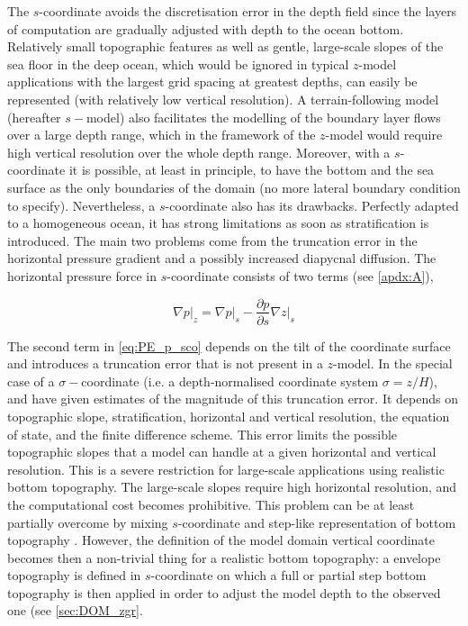 \documentclass[../main/NEMO_manual]{subfiles}
\begin{document}
The $s$-coordinate avoids the discretisation error in the depth field since the layers of
computation are gradually adjusted with depth to the ocean bottom.
Relatively small topographic features as well as  gentle, large-scale slopes of the sea floor in the deep ocean,
which would be ignored in typical $z$-model applications with the largest grid spacing at greatest depths,
can easily be represented (with relatively low vertical resolution).
A terrain-following model (hereafter $s-$model) also facilitates the modelling of the boundary layer flows over
a large depth range, which in the framework of the $z$-model would require high vertical resolution over
the whole depth range.
Moreover, with a $s$-coordinate it is possible, at least in principle, to have the bottom and the sea surface as
the only boundaries of the domain (no more lateral boundary condition to specify).
Nevertheless, a $s$-coordinate also has its drawbacks. Perfectly adapted to a homogeneous ocean,
it has strong limitations as soon as stratification is introduced.
The main two problems come from the truncation error in the horizontal pressure gradient and
a possibly increased diapycnal diffusion.
The horizontal pressure force in $s$-coordinate consists of two terms (see \autoref{apdx:A}),

\begin{equation}
  \label{eq:PE_p_sco}
  \left. {\nabla p} \right|_z =\left. {\nabla p} \right|_s -\frac{\partial
    p}{\partial s}\left. {\nabla z} \right|_s 
\end{equation}

The second term in \autoref{eq:PE_p_sco} depends on the tilt of the coordinate surface and
introduces a truncation error that is not present in a $z$-model.
In the special case of a $\sigma-$coordinate (i.e. a depth-normalised coordinate system $\sigma = z/H$),
\citet{Haney1991} and \citet{Beckmann1993} have given estimates of the magnitude of this truncation error.
It depends on topographic slope, stratification, horizontal and vertical resolution, the equation of state,
and the finite difference scheme.
This error limits the possible topographic slopes that a model can handle at
a given horizontal and vertical resolution.
This is a severe restriction for large-scale applications using realistic bottom topography.
The large-scale slopes require high horizontal resolution, and the computational cost becomes prohibitive.
This problem can be at least partially overcome by mixing $s$-coordinate and
step-like representation of bottom topography \citep{Gerdes1993a,Gerdes1993b,Madec_al_JPO96}.
However, the definition of the model domain vertical coordinate becomes then a non-trivial thing for
a realistic bottom topography:
a envelope topography is defined in $s$-coordinate on which a full or
partial step bottom topography is then applied in order to adjust the model depth to the observed one
(see \autoref{sec:DOM_zgr}.
\end{document}
